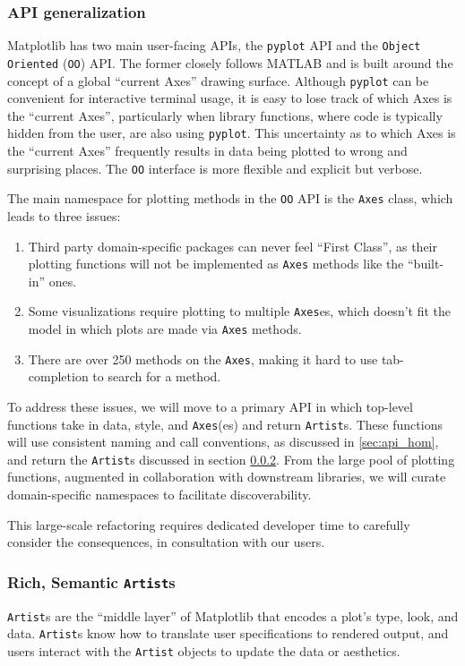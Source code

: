 \documentclass[11pt,letterpaper]{article}  %
\begin{document}
\subsubsection{API generalization}
\label{sec:api_gen}
Matplotlib has two main user-facing APIs, the \texttt{pyplot} API
and the \texttt{Object Oriented} (\texttt{OO})
API.  The former closely follows MATLAB and is built
around the concept of a global ``current Axes'' drawing surface.
Although \texttt{pyplot} can be convenient for interactive terminal
usage, it is easy to lose track of which Axes is the ``current Axes'',
particularly when library functions, where code is typically hidden
from the user, are also using \texttt{pyplot}.
This uncertainty as to which Axes is the ``current Axes'' frequently results in data being
plotted to wrong and surprising places. The \texttt{OO} interface is more flexible and
explicit but verbose.

The main namespace for plotting methods in the \texttt{OO} API is
the \texttt{Axes} class, which leads to three issues:
\begin{enumerate}
\item Third party domain-specific packages can never feel ``First
Class'', as their plotting functions will not be implemented as
\texttt{Axes} methods like the ``built-in'' ones.
\item Some visualizations require plotting to multiple \texttt{Axes}es, which
doesn't fit the model in which plots are made via \texttt{Axes} methods.
\item There are over 250 methods on the \texttt{Axes}, making it hard to use tab-completion to
search for a method.
\end{enumerate}

To address these issues, we will move to a primary API in which
top-level functions take in data, style, and \texttt{Axes}(es) and
return \texttt{Artist}s.  These functions will use consistent naming
and call conventions, as discussed in \ref{sec:api_hom}, and return the
\texttt{Artist}s discussed in section \ref{sec:artists}. From the
large pool of plotting functions, augmented in collaboration with
downstream libraries, we will curate domain-specific namespaces to
facilitate discoverability.

This large-scale refactoring requires dedicated developer time to
carefully consider the consequences, in consultation with our users.


\subsubsection{Rich, Semantic \texttt{Artist}s}
\label{sec:artists}
\texttt{Artist}s are the ``middle layer'' of Matplotlib that encodes a plot's type, look, and data.  \texttt{Artist}s know how to translate user specifications to rendered output, and users interact with the \texttt{Artist} objects to update the data or aesthetics.
\end{document}
